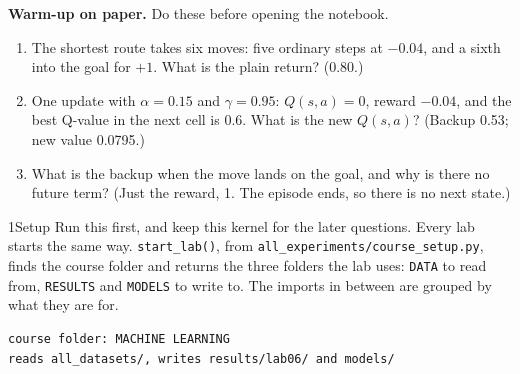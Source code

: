 \labroutine

\begin{yourturn}
\textbf{Warm-up on paper.} Do these before opening the notebook.
\begin{enumerate}
  \item The shortest route takes six moves: five ordinary steps at $-0.04$, and a sixth into the goal for $+1$. What is the plain return? ($0.80$.)
  \item One update with $\alpha=0.15$ and $\gamma=0.95$: $Q(s,a)=0$, reward $-0.04$, and the best Q-value in the next cell is 0.6. What is the new $Q(s,a)$? (Backup 0.53; new value 0.0795.)
  \item What is the backup when the move lands on the goal, and why is there no future term? (Just the reward, 1. The episode ends, so there is no next state.)
\end{enumerate}
\end{yourturn}

\begin{labquestion}{1}{Setup}
Run this first, and keep this kernel for the later questions. Every lab starts the same way. \texttt{start\_lab()}, from \texttt{all\_experiments/\allowbreak course\_setup.py}, finds the course folder and returns the three folders the lab uses: \texttt{DATA} to read from, \texttt{RESULTS} and \texttt{MODELS} to write to. The imports in between are grouped by what they are for.
\end{labquestion}
\begin{labanswer}

\begin{refoutput}
\begin{lstlisting}[style=utpterminal]
course folder: MACHINE LEARNING
reads all_datasets/, writes results/lab06/ and models/
\end{lstlisting}
\end{refoutput}
\end{labanswer}


